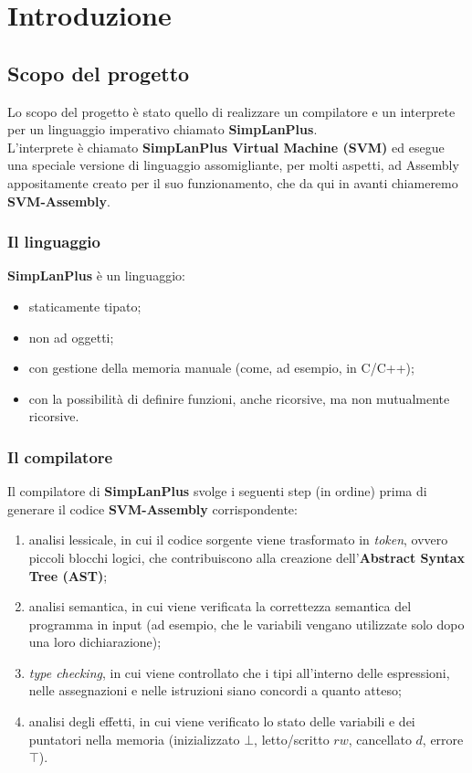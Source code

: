 \documentclass[../report.tex]{subfiles}
\begin{document}
\chapter{Introduzione}\label{c:introduzione}
\section{Scopo del progetto}\label{s:scopo-progetto}
Lo scopo del progetto è stato quello di realizzare un compilatore e un interprete per un linguaggio imperativo chiamato \textbf{SimpLanPlus}.\\
\noindent
L'interprete è chiamato \textbf{SimpLanPlus Virtual Machine (SVM)} ed esegue una speciale versione di linguaggio assomigliante, per molti aspetti, ad Assembly appositamente creato per il suo funzionamento, che da qui in avanti chiameremo \textbf{SVM-Assembly}.

\subsection{Il linguaggio}\label{ss:linguaggio}
\textbf{SimpLanPlus} è un linguaggio:
\begin{itemize}
    \item staticamente tipato;
    \item non ad oggetti;
    \item con gestione della memoria manuale (come, ad esempio, in C/C++);
    \item con la possibilità di definire funzioni, anche ricorsive, ma non mutualmente ricorsive.
\end{itemize}

\subsection{Il compilatore}\label{ss:compilatore}
Il compilatore di \textbf{SimpLanPlus} svolge i seguenti step (in ordine) prima di generare il codice \textbf{SVM-Assembly} corrispondente:
\begin{enumerate}
    \item analisi lessicale, in cui il codice sorgente viene trasformato in \textit{token}, ovvero piccoli blocchi logici, che contribuiscono alla creazione dell'\textbf{Abstract Syntax Tree (AST)};
    \item analisi semantica, in cui viene verificata la correttezza semantica del programma in input (ad esempio, che le variabili vengano utilizzate solo dopo una loro dichiarazione);
    \item \textit{type checking}, in cui viene controllato che i tipi all'interno delle espressioni, nelle assegnazioni e nelle istruzioni siano concordi a quanto atteso;
    \item analisi degli effetti, in cui viene verificato lo stato delle variabili e dei puntatori nella memoria (inizializzato $\bot$, letto/scritto $rw$, cancellato $d$, errore $\top$).
\end{enumerate}
\end{document}
